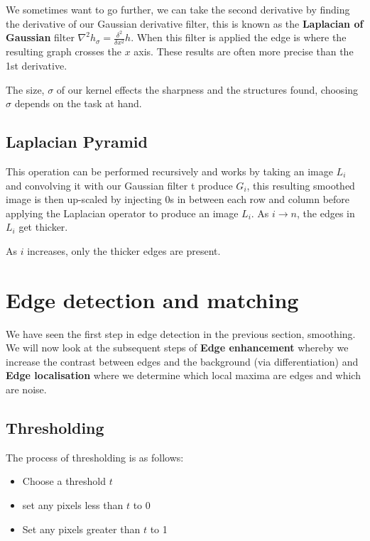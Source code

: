\documentclass{article}
\begin{document}
We sometimes want to go further, we can take the second derivative by finding the derivative of our Gaussian derivative filter, this is known as the \textbf{Laplacian of Gaussian} filter $ \nabla^{2} h_{\sigma} = \frac{\delta^{2}}{\delta x^{2}}h$. When this filter is applied the edge is where the resulting graph crosses the $x$ axis. These results are often more precise than the 1st derivative.

The size, $\sigma$ of our kernel effects the sharpness and the structures found, choosing \(\sigma\) depends on the task at hand.

\subsection{Laplacian Pyramid}

This operation can be performed recursively and works by taking an image $L_{i}$ and convolving it with our Gaussian filter t produce $G_{i}$, this resulting smoothed image is then up-scaled by injecting 0s in between each row and column before applying the Laplacian operator to produce an image $L_{i}$. As $i \rightarrow n$, the edges in $L_{i}$ get thicker.

As $i$ increases, only the thicker edges are present.


\section{Edge detection and matching}

We have seen the first step in edge detection in the previous section, smoothing. We will now look at the subsequent steps of \textbf{Edge enhancement} whereby we increase the contrast between edges and the background (via differentiation) and \textbf{Edge localisation} where we determine which local maxima are edges and which are noise.

\subsection{Thresholding}

The process of thresholding is as follows:

\begin{itemize}
  \item Choose a threshold $t$
  \item set any pixels less than $t$ to 0
  \item Set any pixels greater than $t$ to 1
\end{itemize}
\end{document}
